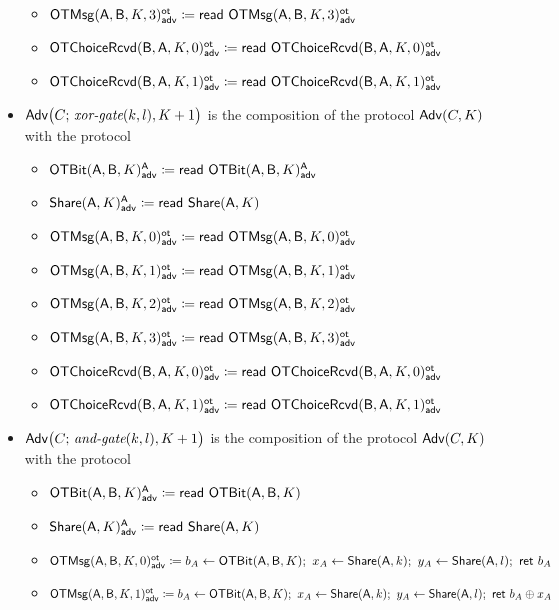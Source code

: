 \begin{itemize}
\begin{itemize}
\item {\color{blue} $\LeakOTMsg(\A,\B,K,3)^\ot_\adv \coloneqq \read{\LeakOTMsg(\A,\B,K,3)^\ot_\adv}$}\medskip
\item {\color{blue} $\LeakOTChoiceRcvd(\B,\A,K,0)^\ot_\adv \coloneqq \read{\LeakOTChoiceRcvd(\B,\A,K,0)^\ot_\adv}$}
\item {\color{blue} $\LeakOTChoiceRcvd(\B,\A,K,1)^\ot_\adv \coloneqq \read{\LeakOTChoiceRcvd(\B,\A,K,1)^\ot_\adv}$}
\end{itemize}
\item $\Adv\big(C; \, \xorgate(k,l),K+1\big)$ is the composition of the protocol $\Adv(C,K)$ with the protocol
\begin{itemize}
\item {\color{blue} $\LeakOTBit(\A,\B,K)^\A_\adv \coloneqq \read{\LeakOTBit(\A,\B,K)^\A_\adv}$}
\item {\color{blue} $\LeakShare(\A,K)^\A_\adv \coloneqq \read{\Share(\A,K)}$}\medskip
\item {\color{blue} $\LeakOTMsg(\A,\B,K,0)^\ot_\adv \coloneqq \read{\LeakOTMsg(\A,\B,K,0)^\ot_\adv}$}
\item {\color{blue} $\LeakOTMsg(\A,\B,K,1)^\ot_\adv \coloneqq \read{\LeakOTMsg(\A,\B,K,1)^\ot_\adv}$}
\item {\color{blue} $\LeakOTMsg(\A,\B,K,2)^\ot_\adv \coloneqq \read{\LeakOTMsg(\A,\B,K,2)^\ot_\adv}$}
\item {\color{blue} $\LeakOTMsg(\A,\B,K,3)^\ot_\adv \coloneqq \read{\LeakOTMsg(\A,\B,K,3)^\ot_\adv}$}\medskip
\item {\color{blue} $\LeakOTChoiceRcvd(\B,\A,K,0)^\ot_\adv \coloneqq \read{\LeakOTChoiceRcvd(\B,\A,K,0)^\ot_\adv}$}
\item {\color{blue} $\LeakOTChoiceRcvd(\B,\A,K,1)^\ot_\adv \coloneqq \read{\LeakOTChoiceRcvd(\B,\A,K,1)^\ot_\adv}$}
\end{itemize}
\item $\Adv\big(C; \, \andgate(k,l),K+1\big)$ is the composition of the protocol $\Adv(C,K)$ with the protocol
\begin{itemize}
\item {\color{blue} $\LeakOTBit(\A,\B,K)^\A_\adv \coloneqq \read{\OTBit(\A,\B,K)}$}
\item {\color{blue} $\LeakShare(\A,K)^\A_\adv \coloneqq \read{\Share(\A,K)}$}\medskip
\item {\color{blue} $\LeakOTMsg(\A,\B,K,0)^\ot_\adv \coloneqq b_A \leftarrow \OTBit(\A,\B,K); \ x_A \leftarrow \Share(\A,k); \ y_A \leftarrow \Share(\A,l); \ \ret{b_A}$}
\item {\color{blue} $\LeakOTMsg(\A,\B,K,1)^\ot_\adv \coloneqq b_A \leftarrow \OTBit(\A,\B,K); \ x_A \leftarrow \Share(\A,k); \ y_A \leftarrow \Share(\A,l); \ \ret{b_A \oplus x_A}$}

\end{itemize}
\end{itemize}
